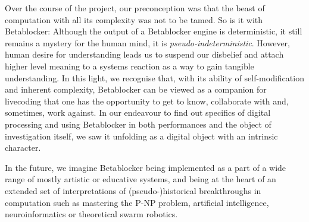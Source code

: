 \documentclass[letterpaper, 12pt]{article}
\begin{document}
Over the course of the project, our preconception was that the beast of computation with all its complexity was not to be tamed. 
So is it with Betablocker: Although the output of a Betablocker engine is deterministic, it still remains a mystery for the human mind, it is \emph{pseudo-indeterministic}. 
However, human desire for understanding leads us to suspend our disbelief and attach higher level meaning to a systems reaction as a way to gain tangible understanding.
In this light, we recognise that, with its ability of self-modification and inherent complexity, Betablocker can be viewed as a companion for livecoding that one has the opportunity to get to know, collaborate with and, sometimes, work against.
In our endeavour to find out specifics of digital processing and using Betablocker in both performances and the object of investigation itself, we saw it unfolding as a digital object with an intrinsic character.

In the future, we imagine Betablocker being implemented as a part of a wide range of mostly artistic or educative systems, and being at the heart of an extended set of interpretations of (pseudo-)historical breakthroughs in computation such as mastering the P-NP problem, artificial intelligence, neuroinformatics or theoretical swarm robotics.
\parskip 18pt




% 

\end{document}
